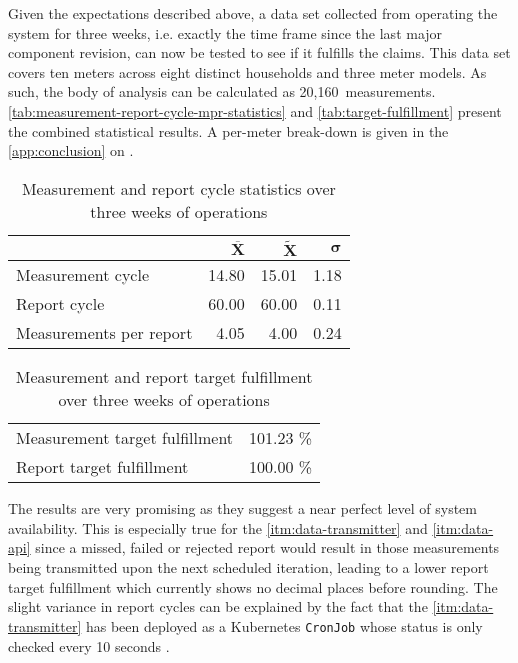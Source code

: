 Given the expectations described above, a data set collected from operating the system for three weeks, i.e. exactly the time frame since the last major component revision, can now be tested to see if it fulfills the claims. This data set covers ten meters across eight distinct households and three meter models. As such, the body of analysis can be calculated as 20,160~measurements. \autoref{tab:measurement-report-cycle-mpr-statistics} and \autoref{tab:target-fulfillment} present the combined statistical results. A per-meter break-down is given in the \autoref{app:conclusion} on .

\begin{table}[hbt]
	\centering
  	\begin{tabularx}{\textwidth}{|X|r|r|r|}
		\hline
		& ${\overline{\textbf{X}}}$ & $\widetilde{\textbf{X}}$ & $\boldsymbol{\sigma}$ \\
	    	\hline
	    	Measurement cycle 			& 14.80 & 15.01 & 1.18 \\
	    	Report cycle 				& 60.00 & 60.00 & 0.11 \\
	    	Measurements per report 	&  4.05 &  4.00 & 0.24 \\
	    	\hline
	\end{tabularx}
  	\caption[Measurement and report cycle statistics over three weeks]{Measurement and report cycle statistics over three weeks of operations}
  	\label{tab:measurement-report-cycle-mpr-statistics}
\end{table}

\FloatBarrier

\begin{table}[hbt]
	\centering
  	\begin{tabularx}{\textwidth}{|X|r|}
		\hline
	    	Measurement target fulfillment 			& 101.23 \% \\
	    	Report target fulfillment 				& 100.00 \% \\
	    	\hline
	\end{tabularx}
  	\caption[Measurement and report target fulfillment over three weeks]{Measurement and report target fulfillment over three weeks of operations}
  	\label{tab:target-fulfillment}
\end{table}

The results are very promising as they suggest a near perfect level of system availability. This is especially true for the \ref{itm:data-transmitter} and \ref{itm:data-api} since a missed, failed or rejected report would result in those measurements being transmitted upon the next scheduled iteration, leading to a lower report target fulfillment which currently shows no decimal places before rounding. The slight variance in report cycles can be explained by the fact that the \ref{itm:data-transmitter} has been deployed as a Kubernetes \texttt{CronJob} whose status is only checked every 10 seconds \cite{kubernetesCronjob}.

